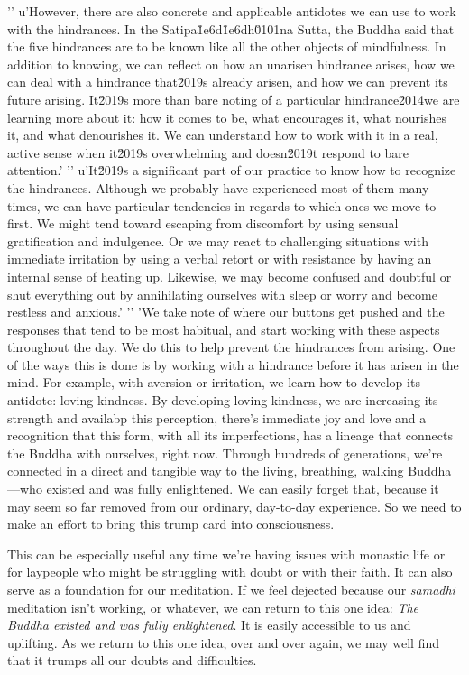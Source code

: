'\n'
u'However, there are also concrete and applicable antidotes we can use to work with the hindrances. In the Satipa\u1e6d\u1e6dh\u0101na Sutta, the Buddha said that the five hindrances are to be known like all the other objects of mindfulness. In addition to knowing, we can reflect on how an unarisen hindrance arises, how we can deal with a hindrance that\u2019s already arisen, and how we can prevent its future arising. It\u2019s more than bare noting of a particular hindrance\u2014we are learning more about it: how it comes to be, what encourages it, what nourishes it, and what denourishes it. We can understand how to work with it in a real, active sense when it\u2019s overwhelming and doesn\u2019t respond to bare attention.'
'\n'
u'It\u2019s a significant part of our practice to know how to recognize the hindrances. Although we probably have experienced most of them many times, we can have particular tendencies in regards to which ones we move to first. We might tend toward escaping from discomfort by using sensual gratification and indulgence. Or we may react to challenging situations with immediate irritation by using a verbal retort or with resistance by having an internal sense of heating up. Likewise, we may become confused and doubtful or shut everything out by annihilating ourselves with sleep or worry and become restless and anxious.'
'\n'
'We take note of where our buttons get pushed and the responses that tend to be most habitual, and start working with these aspects throughout the day. We do this to help prevent the hindrances from arising. One of the ways this is done is by working with a hindrance before it has arisen in the mind. For example, with aversion or irritation, we learn how to develop its antidote: loving-kindness. By developing loving-kindness, we are increasing its strength and availabp this perception, there's 
immediate joy and love and a recognition that this form, with all its 
imperfections, has a lineage that connects the Buddha with ourselves, 
right now. Through hundreds of generations, we're connected in a direct 
and tangible way to the living, breathing, walking Buddha---who existed 
and was fully enlightened. We can easily forget that, because it may 
seem so far removed from our ordinary, day-to-day experience. So we 
need to make an effort to bring this trump card into consciousness.

This can be especially useful any time we're having issues with 
monastic life or for laypeople who might be struggling with doubt or 
with their faith. It can also serve as a foundation for our meditation. 
If we feel dejected because our \emph{samādhi} meditation isn't 
working, or whatever, we can return to this one idea: \emph{The Buddha 
existed and was fully enlightened}. It is easily accessible to us and 
uplifting. As we return to this one idea, over and over again, we may 
well find that it trumps all our doubts and difficulties.

